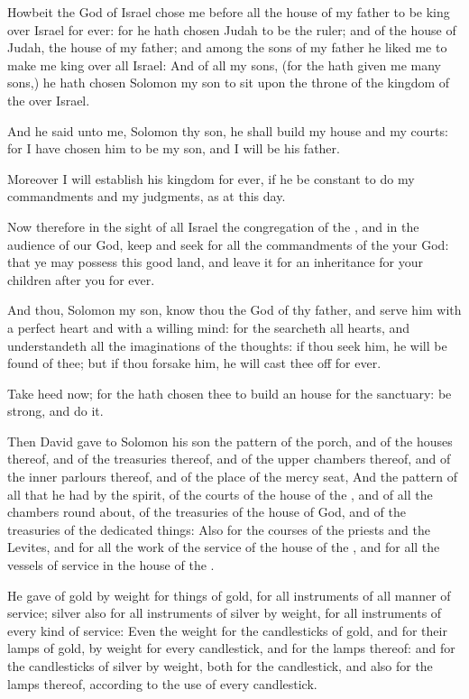 \verse Howbeit the \LORD God of Israel chose me before all the house of my father to be king over Israel for ever: for he hath chosen Judah to be the ruler; and of the house of Judah, the house of my father; and among the sons of my father he liked me to make me king over all Israel: \verse And of all my sons, (for the \LORD hath given me many sons,) he hath chosen Solomon my son to sit upon the throne of the kingdom of the \LORD over Israel.

\verse And he said unto me, Solomon thy son, he shall build my house and my courts: for I have chosen him to be my son, and I will be his father.

\verse Moreover I will establish his kingdom for ever, if he be constant to do my commandments and my judgments, as at this day.

\verse Now therefore in the sight of all Israel the congregation of the \LORD, and in the audience of our God, keep and seek for all the commandments of the \LORD your God: that ye may possess this good land, and leave it for an inheritance for your children after you for ever.

\verse And thou, Solomon my son, know thou the God of thy father, and serve him with a perfect heart and with a willing mind: for the \LORD searcheth all hearts, and understandeth all the imaginations of the thoughts: if thou seek him, he will be found of thee; but if thou forsake him, he will cast thee off for ever.

\verse Take heed now; for the \LORD hath chosen thee to build an house for the sanctuary: be strong, and do it.

\verse Then David gave to Solomon his son the pattern of the porch, and of the houses thereof, and of the treasuries thereof, and of the upper chambers thereof, and of the inner parlours thereof, and of the place of the mercy seat, \verse And the pattern of all that he had by the spirit, of the courts of the house of the \LORD, and of all the chambers round about, of the treasuries of the house of God, and of the treasuries of the dedicated things: \verse Also for the courses of the priests and the Levites, and for all the work of the service of the house of the \LORD, and for all the vessels of service in the house of the \LORD.

\verse He gave of gold by weight for things of gold, for all instruments of all manner of service; silver also for all instruments of silver by weight, for all instruments of every kind of service: \verse Even the weight for the candlesticks of gold, and for their lamps of gold, by weight for every candlestick, and for the lamps thereof: and for the candlesticks of silver by weight, both for the candlestick, and also for the lamps thereof, according to the use of every candlestick.

